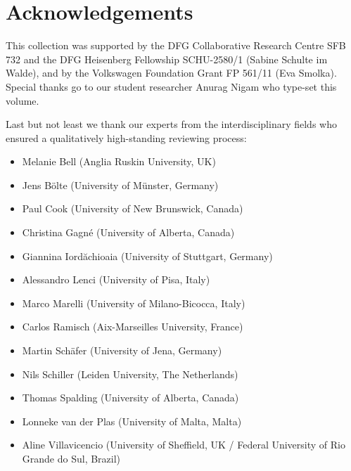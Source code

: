 \documentclass[output=paper]{langsci/langscibook}
\begin{document}
\section*{Acknowledgements}

This collection was supported by the DFG Collaborative Research Centre
SFB 732 and the DFG Heisenberg Fellowship SCHU-2580/1 (Sabine Schulte
im Walde), and by the Volkswagen Foundation Grant FP 561/11 (Eva
Smolka). Special thanks go to our student researcher Anurag Nigam who
type-set this volume.

Last but not least we thank our experts from the interdisciplinary
fields who ensured a qualitatively high-standing reviewing process:

\begin{itemize}
\item Melanie Bell (Anglia Ruskin University, UK)
\item Jens Bölte (University of Münster, Germany)
\item Paul Cook (University of New Brunswick, Canada)
\item Christina Gagné (University of Alberta, Canada)
\item Giannina Iord\u{a}chioaia (University of Stuttgart, Germany)
\item Alessandro Lenci (University of Pisa, Italy)
\item Marco Marelli (University of Milano-Bicocca, Italy)
\item Carlos Ramisch (Aix-Marseilles University, France)
\item Martin Schäfer (University of Jena, Germany)
\item Nils Schiller (Leiden University, The Netherlands)
\item Thomas Spalding (University of Alberta, Canada)
\item Lonneke van der Plas (University of Malta, Malta)
\item Aline Villavicencio (University of Sheffield, UK / Federal University of Rio Grande do Sul, Brazil)
\end{itemize}

{\sloppy\printbibliography[heading=subbibliography,notkeyword=this]}
\end{document}
